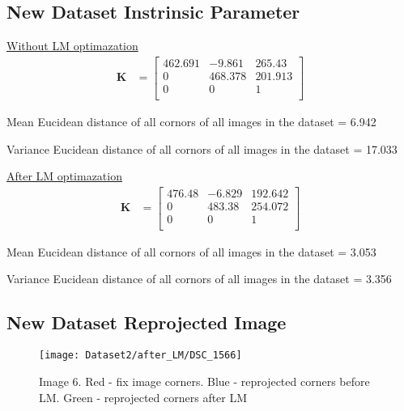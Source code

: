\documentclass[11pt]{article}
\begin{document}

\subsection*{New Dataset Instrinsic Parameter}

\underline{Without LM optimazation}
\begin{align*}
\mathbf{K} &= \begin{bmatrix} 
462.691 & -9.861 & 265.43 \\
0 & 468.378 & 201.913 \\
0 & 0 & 1 \\
\end{bmatrix}
\end{align*}

Mean Eucidean distance of all cornors of all images in the dataset = 6.942

Variance Eucidean distance of all cornors of all images in the dataset = 17.033

\vspace{1cm}
\underline{After LM optimazation}
\begin{align*}
\mathbf{K} &= \begin{bmatrix} 
476.48 & -6.829 & 192.642 \\
0 & 483.38 & 254.072 \\
0 & 0 & 1 \\
\end{bmatrix}
\end{align*}

Mean Eucidean distance of all cornors of all images in the dataset = 3.053

Variance Eucidean distance of all cornors of all images in the dataset = 3.356


\subsection*{New Dataset Reprojected Image}

\begin{figure}[H]
\centering
\texttt{[image: Dataset2/after\_LM/DSC\_1566]}
\caption{Image 6. Red - fix image corners. Blue - reprojected corners before LM. Green - reprojected corners after LM}
\label{}
\end{figure}
\end{document}
